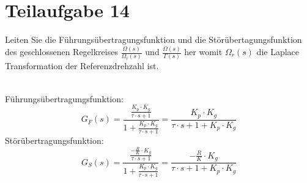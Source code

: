 \section{Teilaufgabe 14}
\begin{aufgabe}
    Leiten Sie die Führungsübertragungsfunktion und die 
    Störübertagungsfunktion des geschlossenen Regelkreises 
    $\frac{\Omega(s)}{\Omega_r(s)}$ und $\frac{\Omega(s)}{\Gamma(s)}$ her 
    womit $\Omega_r(s)$ die Laplace Transformation der Referenzdrehzahl ist.
\end{aufgabe}
\\
Führungsübertragungsfunktion: 
\[ G_F(s) 
    = \frac{\frac{K_p \cdot K_g}{\tau \cdot s + 1}}
        {1 + \frac{K_p \cdot K_g}{\tau \cdot s + 1}}
    = \frac{K_p \cdot K_g}{\tau \cdot s + 1 + K_p \cdot K_g}
\]
Störübertragungsfunktion:
\[ G_S(s)
    = \frac{\frac{-\frac{R}{K} \cdot K_g}{\tau \cdot s + 1}}
        {1 + \frac{K_p \cdot K_g}{\tau \cdot s + 1}}
    = \frac{-\frac{R}{K} \cdot K_g}{\tau \cdot s + 1 + K_p \cdot K_g}
\]
